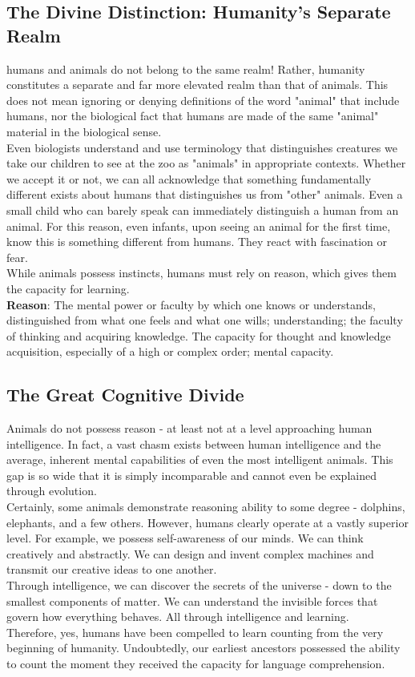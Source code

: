 \documentclass[12pt, oneside, openany]{book}
\begin{document}
\subsection{The Divine Distinction: Humanity's Separate Realm}

humans and animals do not belong to the same realm! Rather, humanity constitutes a separate and far more elevated realm than that of animals. This does not mean ignoring or denying definitions of the word "animal" that include humans, nor the biological fact that humans are made of the same "animal" material in the biological sense.\\
Even biologists understand and use terminology that distinguishes creatures we take our children to see at the zoo as "animals" in appropriate contexts. Whether we accept it or not, we can all acknowledge that something fundamentally different exists about humans that distinguishes us from "other" animals. Even a small child who can barely speak can immediately distinguish a human from an animal. For this reason, even infants, upon seeing an animal for the first time, know this is something different from humans. They react with fascination or fear.\\
While animals possess instincts, humans must rely on reason, which gives them the capacity for learning.\\
\textbf{Reason}: The mental power or faculty by which one knows or understands, distinguished from what one feels and what one wills; understanding; the faculty of thinking and acquiring knowledge. The capacity for thought and knowledge acquisition, especially of a high or complex order; mental capacity.
\subsection{The Great Cognitive Divide}

Animals do not possess reason - at least not at a level approaching human intelligence. In fact, a vast chasm exists between human intelligence and the average, inherent mental capabilities of even the most intelligent animals. This gap is so wide that it is simply incomparable and cannot even be explained through evolution.\\
Certainly, some animals demonstrate reasoning ability to some degree - dolphins, elephants, and a few others. However, humans clearly operate at a vastly superior level. For example, we possess self-awareness of our minds. We can think creatively and abstractly. We can design and invent complex machines and transmit our creative ideas to one another.\\
Through intelligence, we can discover the secrets of the universe - down to the smallest components of matter. We can understand the invisible forces that govern how everything behaves. All through intelligence and learning.\\
Therefore, yes, humans have been compelled to learn counting from the very beginning of humanity. Undoubtedly, our earliest ancestors possessed the ability to count the moment they received the capacity for language comprehension.
\end{document}
